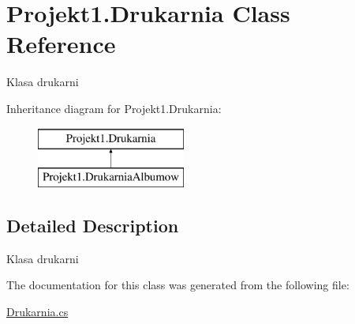 \hypertarget{class_projekt1_1_1_drukarnia}{}\section{Projekt1.\+Drukarnia Class Reference}
\label{class_projekt1_1_1_drukarnia}


Klasa drukarni  


Inheritance diagram for Projekt1.\+Drukarnia\+:\begin{figure}[H]
\begin{center}
\leavevmode
\includegraphics[height=2.000000cm]{class_projekt1_1_1_drukarnia}
\end{center}
\end{figure}


\subsection{Detailed Description}
Klasa drukarni 



The documentation for this class was generated from the following file\+:\begin{DoxyCompactItemize}
\item 
\mbox{\hyperlink{_drukarnia_8cs}{Drukarnia.\+cs}}\end{DoxyCompactItemize}
